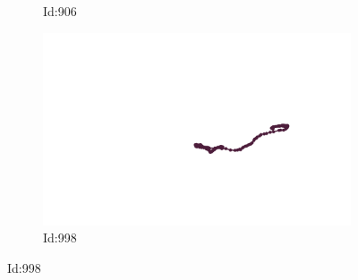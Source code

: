 \documentclass[12pt,twoside]{report}
\begin{document}
\begin{figure}
\begin{subfigure}[b]{0.20\textwidth}
\caption{Id:906}
\end{subfigure}
\begin{subfigure}[b]{0.20\textwidth}
\centering
\includegraphics[width=\textwidth]{../trajectories/998.png}
\caption{Id:998}
\end{subfigure}
\end{figure}
\end{document}
